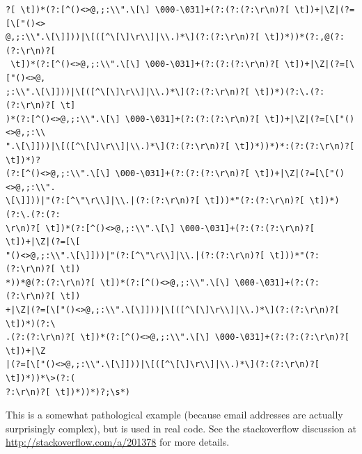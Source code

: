 \documentclass[]{book}
\begin{document}
\begin{verbatim}
?[ \t])*(?:[^()<>@,;:\\".\[\] \000-\031]+(?:(?:(?:\r\n)?[ \t])+|\Z|(?=[\["()<>
@,;:\\".\[\]]))|\[([^\[\]\r\\]|\\.)*\](?:(?:\r\n)?[ \t])*))*(?:,@(?:(?:\r\n)?[
 \t])*(?:[^()<>@,;:\\".\[\] \000-\031]+(?:(?:(?:\r\n)?[ \t])+|\Z|(?=[\["()<>@,
;:\\".\[\]]))|\[([^\[\]\r\\]|\\.)*\](?:(?:\r\n)?[ \t])*)(?:\.(?:(?:\r\n)?[ \t]
)*(?:[^()<>@,;:\\".\[\] \000-\031]+(?:(?:(?:\r\n)?[ \t])+|\Z|(?=[\["()<>@,;:\\
".\[\]]))|\[([^\[\]\r\\]|\\.)*\](?:(?:\r\n)?[ \t])*))*)*:(?:(?:\r\n)?[ \t])*)?
(?:[^()<>@,;:\\".\[\] \000-\031]+(?:(?:(?:\r\n)?[ \t])+|\Z|(?=[\["()<>@,;:\\".
\[\]]))|"(?:[^\"\r\\]|\\.|(?:(?:\r\n)?[ \t]))*"(?:(?:\r\n)?[ \t])*)(?:\.(?:(?:
\r\n)?[ \t])*(?:[^()<>@,;:\\".\[\] \000-\031]+(?:(?:(?:\r\n)?[ \t])+|\Z|(?=[\[
"()<>@,;:\\".\[\]]))|"(?:[^\"\r\\]|\\.|(?:(?:\r\n)?[ \t]))*"(?:(?:\r\n)?[ \t])
*))*@(?:(?:\r\n)?[ \t])*(?:[^()<>@,;:\\".\[\] \000-\031]+(?:(?:(?:\r\n)?[ \t])
+|\Z|(?=[\["()<>@,;:\\".\[\]]))|\[([^\[\]\r\\]|\\.)*\](?:(?:\r\n)?[ \t])*)(?:\
.(?:(?:\r\n)?[ \t])*(?:[^()<>@,;:\\".\[\] \000-\031]+(?:(?:(?:\r\n)?[ \t])+|\Z
|(?=[\["()<>@,;:\\".\[\]]))|\[([^\[\]\r\\]|\\.)*\](?:(?:\r\n)?[ \t])*))*\>(?:(
?:\r\n)?[ \t])*))*)?;\s*)
\end{verbatim}

This is a somewhat pathological example (because email addresses are actually surprisingly complex), but is used in real code. See the stackoverflow discussion at \url{http://stackoverflow.com/a/201378} for more details.
\end{document}
